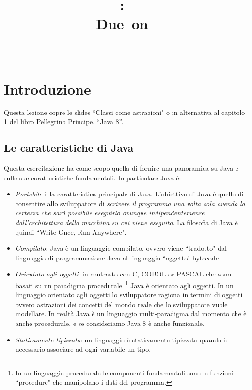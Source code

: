 \documentclass{article}
\title{
\vspace{2in}
\textmd{\textbf{\hmwkClass:\ \hmwkTitle}}\\
\normalsize\vspace{0.1in}\small{Due\ on\ \hmwkDueDate}\\
\vspace{0.1in}\large{\textit{\hmwkClassInstructor\ \hmwkClassTime}}
\vspace{3in}
}
\author{\textbf{\hmwkAuthorName}}
\date{} %
\theoremstyle{definition}
\begin{document}
\maketitle



\newpage
\tableofcontents
\newpage



\section{Introduzione}
Questa lezione copre le  slides ``Classi come astrazioni" o in alternativa al capitolo  1 del libro  Pellegrino Principe. “Java 8”.


\subsection{Le caratteristiche di Java}
Questa esercitazione ha come scopo quella di fornire una panoramica su Java e sulle sue caratteristiche fondamentali. In particolare Java \`e:
\begin{itemize}
\item \emph{Portabile} \`e la caratteristica principale di Java. L'obiettivo di Java \`e quello di consentire allo sviluppatore di  \emph{scrivere il programma una volta sola avendo la certezza che sar\`a possibile eseguirlo ovunque indipendentemenre dall'architettura della macchina su cui viene eseguito}. La filosofia di Java \`e quindi ``Write Once, Run Anywhere".
\item \emph{Compilato}: Java \`e un linguaggio compilato, ovvero viene ``tradotto" dal linguaggio di programmazione Java al linguaggio ``oggetto" bytecode. 
\item \emph{Orientato agli oggetti}: in contrasto con C, COBOL or PASCAL che sono basati su un paradigma procedurale~\footnote{In un linguaggio procedurale le componenti fondamentali sono le funzioni ``procedure" che manipolano i dati del programma.} Java \`e orientato agli oggetti. In un linguaggio orientato agli oggetti lo sviluppatore ragiona in termini di oggetti ovvero astrazioni dei concetti del mondo reale che lo sviluppatore vuole modellare. In realt\`a Java \`e un linguaggio multi-paradigma dal momento che \`e anche procedurale, e se consideriamo Java 8 \`e anche funzionale.
\item \emph{Staticamente tipizzato}: un linguaggio \`e staticamente tipizzato quando \`e necessario associare ad ogni variabile un tipo.
\end{itemize}
\end{document}

